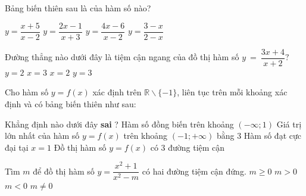 \begin{ex}%
	Bảng biến thiên sau là của hàm số nào?
	\begin{center}
	\end{center}
	\choice
	{\True $ y = \dfrac{x+5}{x-2} $}
	{$ y = \dfrac{2x-1}{x+3} $}
	{$ y = \dfrac{4x-6}{x - 2} $}
	{ $ y = \dfrac{3-x}{2-x} $}
\end{ex}

\begin{ex}%
Đường thẳng nào dưới đây là tiệm cận ngang của đồ thị hàm số $ y~=~ \dfrac{3x + 4}{x + 2}? $	
	\choice
	{$ y = 2 $}
	{$ x = 3 $}
	{$ x = 2 $}
	{\True $ y = 3 $}
\end{ex}

\begin{ex}%
	Cho hàm số $ y = f\left(x\right) $ xác định trên $ \mathbb{R} \backslash \{-1 \} $, liên tục trên mỗi khoảng xác định và có bảng biến thiên như sau:
	\begin{center}
	\end{center}
	Khẳng định nào dưới đây \textbf{sai} ?
	\choice
	{\True Hàm số đồng biến trên khoảng $ \left( - \infty ; 1 \right) $}
	{Giá trị lớn nhất của hàm số $ y = f \left(x \right) $ trên khoảng $ \left(-1; + \infty \right) $ bằng 3}
	{Hàm số đạt cực đại tại $ x = 1 $}
	{Đồ thị hàm số $ y = f \left(x \right)$ có 3 đường tiệm cận  }
\end{ex}

\begin{ex}%
Tìm $ m $	 để đồ thị hàm số $ y = \dfrac{x^2 + 1}{x^2 - m} $ có hai đường tiệm cận đứng.
	\choice
	{$ m \geq 0 $}
	{\True $ m > 0 $}
	{$ m < 0 $}
	{$ m \neq 0 $ }
\end{ex}

